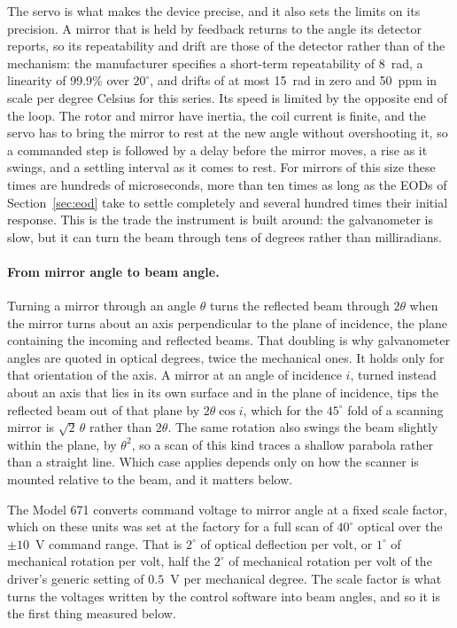 \documentclass{article}
\begin{document}
The servo is what makes the device precise, and it also sets the limits on its precision. A
mirror that is held by feedback returns to the angle its detector reports, so its repeatability and
drift are those of the detector rather than of the mechanism: the manufacturer specifies a
short-term repeatability of 8~\textmu rad, a linearity of 99.9\% over $20^\circ$, and drifts of at
most 15~\textmu rad in zero and 50~ppm in scale per degree Celsius for this series. Its speed is limited by the opposite end of the
loop. The rotor and mirror have inertia, the coil current is finite, and the servo has to bring the
mirror to rest at the new angle without overshooting it, so a commanded step is followed by a delay
before the mirror moves, a rise as it swings, and a settling interval as it comes to rest. For
mirrors of this size these times are hundreds of microseconds, more than ten times as long as the
EODs of Section~\ref{sec:eod} take to settle completely and several hundred
times their initial response. This is the trade the instrument is built
around: the galvanometer is slow, but it can turn the beam through tens of degrees rather than
milliradians.

\paragraph{From mirror angle to beam angle.}
Turning a mirror through an angle $\theta$ turns the reflected beam through $2\theta$ when the
mirror turns about an axis perpendicular to the plane of incidence, the plane containing the
incoming and reflected beams. That doubling is why galvanometer angles are quoted in optical
degrees, twice the mechanical ones. It holds only for that orientation of the axis. A mirror at
an angle of incidence $i$, turned instead about an axis that lies in its own surface and in the
plane of incidence, tips the reflected beam out of that plane by $2\theta\cos i$, which for the
$45^\circ$ fold of a scanning mirror is $\sqrt{2}\,\theta$ rather than $2\theta$. The same rotation
also swings the beam slightly within the plane, by $\theta^2$, so a scan of this kind traces a
shallow parabola rather than a straight line. Which case
applies depends only on how the scanner is mounted relative to the beam, and it matters below.

The Model 671 converts command voltage to mirror angle at a fixed scale factor, which on these units
was set at the factory for a full scan of $40^\circ$ optical over the $\pm10$~V command range.
That is $2^\circ$ of optical deflection per volt, or $1^\circ$ of mechanical rotation per volt,
half the $2^\circ$ of mechanical rotation per volt of the driver's generic setting of $0.5$~V per
mechanical degree. The scale factor is what turns
the voltages written by the control software into beam angles, and so it is the first thing
measured below.
\end{document}
